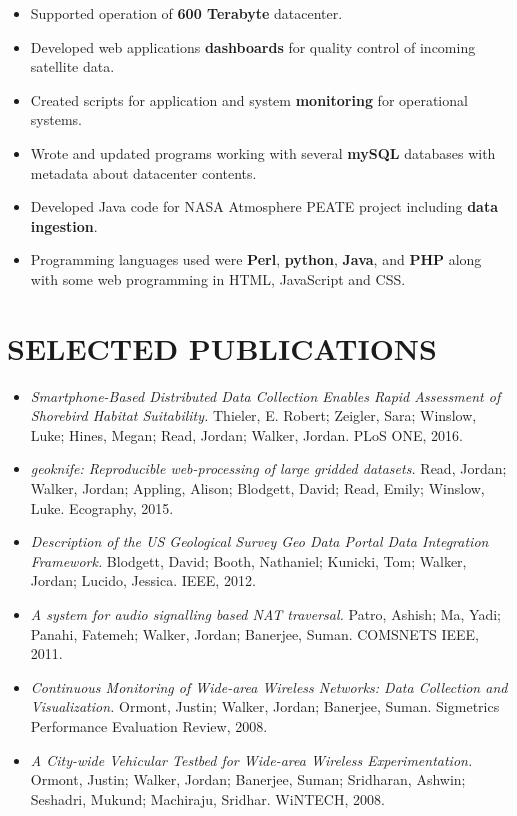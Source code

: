 \documentclass[line,margin]{res}
\begin{document}
\begin{resume}
	\begin{itemize} \itemsep -2pt %
                 	\item Supported operation of \textbf{600 Terabyte} datacenter.
		\item Developed web applications \textbf{dashboards} for quality control of incoming satellite data.
		\item Created scripts for application and system \textbf{monitoring} for operational systems. 
		\item Wrote and updated programs working with several \textbf{mySQL} databases with metadata about datacenter contents.
                 	\item Developed Java code for NASA Atmosphere PEATE project including \textbf{data ingestion}.
		\item Programming languages used were \textbf{Perl}, \textbf{python}, \textbf{Java}, and \textbf{PHP} along with some web programming in HTML, JavaScript and CSS.
                \end{itemize}

\section{SELECTED PUBLICATIONS}
	\begin{itemize} \itemsep -2pt
		\item {\sl Smartphone-Based Distributed Data Collection Enables Rapid Assessment of Shorebird Habitat Suitability.} Thieler, E. Robert; Zeigler, Sara; Winslow, Luke; Hines, Megan; Read, Jordan; Walker, Jordan. PLoS ONE, 2016.
		\item {\sl geoknife: Reproducible web-processing of large gridded datasets.} Read, Jordan; Walker, Jordan; Appling, Alison; Blodgett, David; Read, Emily; Winslow, Luke. Ecography, 2015.
		\item {\sl Description of the US Geological Survey Geo Data Portal Data Integration Framework.}  Blodgett, David; Booth, Nathaniel; Kunicki, Tom; Walker, Jordan; Lucido, Jessica. IEEE, 2012.
		\item {\sl A system for audio signalling based NAT traversal.} Patro, Ashish; Ma, Yadi; Panahi, Fatemeh; Walker, Jordan; Banerjee, Suman. COMSNETS IEEE, 2011.
     		\item {\sl Continuous Monitoring of Wide-area Wireless Networks: Data Collection and Visualization.} Ormont, Justin; Walker, Jordan; Banerjee, Suman. Sigmetrics Performance Evaluation Review, 2008.
		\item {\sl A City-wide Vehicular Testbed for Wide-area Wireless Experimentation.} Ormont, Justin; Walker, Jordan; Banerjee, Suman; Sridharan, Ashwin; Seshadri, Mukund; Machiraju, Sridhar. WiNTECH, 2008.
	\end{itemize}


\end{resume}
\end{document}
